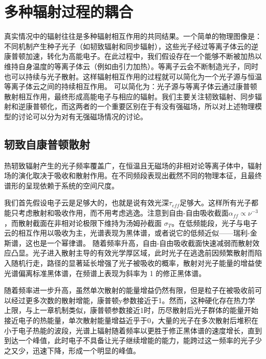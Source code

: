 \chapter{多种辐射过程的耦合}
真实情况中的辐射往往是多种辐射相互作用的共同结果。一个简单的物理图像是：不同机制产生种子光子（如韧致辐射和同步辐射），这些光子经过等离子体云的逆康普顿加速，转化为高能电子。在此过程中，我们假设存在一个能够不断被加热以维持自身温度的等离子体云（例如由引力加热）。等离子云会不断制造光子，同时也可以持续与光子散射。这样辐射相互作用的过程就可以简化为一个光子源与恒温等离子体云之间的持续相互作用。
可以简化为：光子源与等离子体云通过康普顿散射相互作用，最终形成高能电子与相应的辐射。我们主要关注韧致辐射、同步辐射和逆康普顿化，而这两者的一个重要区别在于有没有强磁场，所以对上述物理模型的讨论可以分为对有无强磁场情况的讨论。

\section{轫致自康普顿散射}
热轫致辐射产生的光子频率覆盖广，在恒温且无磁场的非相对论等离子体中，辐射场的演化取决于吸收和散射作用。在不同频段表现出截然不同的物理本征，且最终谱形的呈现依赖于系统的空间尺度。

我们首先假设电子云是足够大的，也就是说有效光深$\tau_{eff}$足够大。这样所有光子都能只考虑散射和吸收作用，而不用考虑逃逸。注意到自由-自由吸收截面$\alpha_{ff} \propto \nu^{-3}$，而散射截面在非相对论极限下维持为汤姆孙截面 $\sigma_T$。在低频能段，光子与电子云的相互作用以吸收为主，光谱表现为黑体谱，或者说它的低频近似——瑞利-金斯谱，这也是一个幂律谱。
随着频率升高，自由-自由吸收截面快速减弱而散射效应凸显。光子进入散射主导的有效光学厚区域，此时光子在逃逸前因频繁散射而陷入随机行走，路径的显著延长增强了光子被吸收的概率，散射对光子能量的增益使光谱偏离标准黑体谱，在频谱上表现为斜率为 1 的修正黑体谱。

随着频率进一步升高，虽然单次散射的能量增益仍然有限，但是粒子在被吸收前可以经过更多次数的散射增能，康普顿y参数接近于1。然而，这种硬化存在热力学上限，与上一章机制类似，康普顿参数接近1时，历尽散射后光子群体的能量开始接近电子的热能量，单次散射能量增益近乎于0，大量的光子在多次散射后堆积在小于电子热能的波段，光谱上辐射随着频率以更胜于修正黑体谱的速度增长，直到到达一个峰值，此时电子不具备让光子继续增能的能力，能跨过这一频率的光子少之又少，迅速下降，形成一个明显的峰值。

